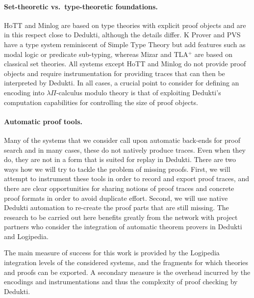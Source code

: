 \paragraph*{Set-theoretic vs.\ type-theoretic foundations.}
HoTT and Minlog are based on type theories with explicit proof objects and are
in this respect close to Dedukti, although the details differ. K Prover
and PVS have a type system reminiscent of Simple Type Theory but add features
such as modal logic or predicate sub-typing, whereas Mizar and TLA$^+$ are based
on classical set theories. All systems except HoTT and Minlog do not provide
proof objects and require instrumentation for providing traces that can then be
interpreted by Dedukti. In all cases, a crucial point to consider for defining
an encoding into $\lambda\Pi$-calculus modulo theory is that of exploiting
Dedukti's computation capabilities for controlling the size of proof objects.

\paragraph*{Automatic proof tools.}
Many of the systems that we consider call upon automatic back-ends for proof
search and in many cases, these do not natively produce traces. Even
when they do, they are not in a form that is suited for replay in
Dedukti. There are two ways how we will try to tackle the problem of
missing proofs. First, we will attempt to instrument these tools in
order to record and export proof traces, and there are clear
opportunities for sharing notions of proof traces and concrete proof
formats in order to avoid duplicate effort. Second, we will use native
Dedukti automation to re-create the proof parts that are still missing.
The research to be carried out here benefits greatly from the network with
project partners who consider the integration of automatic theorem provers in
Dedukti and Logipedia.

The main measure of success for this work is provided by the Logipedia
integration levels of the considered systems, and the fragments for which
theories and proofs can be exported. A secondary measure is the overhead
incurred by the encodings and instrumentations and thus the complexity of proof
checking by Dedukti.


